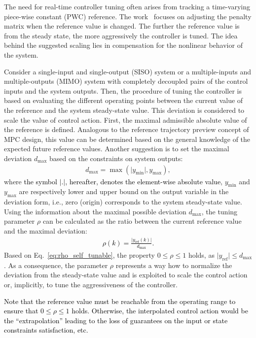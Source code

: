 \documentclass[preprint,12pt]{elsarticle}
\newcommand{\change}[1]{\textcolor{black}{#1}}
\begin{document}
	The need for real-time controller tuning often arises from tracking a time-varying piece-wise constant (PWC) reference. The work~\cite{self_tunable} focuses on adjusting the penalty matrix when the reference value is changed. The further the reference value is from the steady state, the more aggressively the controller is tuned. The idea behind the suggested scaling lies in compensation for the nonlinear behavior of the system.  
	
	Consider a single-input and single-output (SISO) system or a multiple-inputs and multiple-outputs (MIMO) system with completely decoupled pairs of the control inputs and the system outputs. 
	Then, the procedure of tuning the controller is based on evaluating the different operating points between the current value of the reference and the system steady-state value. This deviation is considered to scale the value of control action. First, the maximal admissible absolute value of the reference is defined. Analogous to the reference trajectory preview concept of MPC design, this value can be determined based on the general knowledge of the expected future reference values. Another suggestion is to set the maximal deviation $d_{\max}$ based on the constraints on system outputs: 	
	\begin{eqnarray}
		\label{eq:d_max}
		d_{\max} = \max(\vert y_{\min} \vert, y_{\max}),
	\end{eqnarray}	
	where \change{the symbol $\lvert.\rvert$, hereafter, denotes the element-wise absolute value}, $y_{\min}$ and $y_{\max}$ are respectively lower and upper bound on the output variable in the deviation form, i.e., zero (origin) corresponds to the system steady-state value. Using the information about the maximal possible deviation $d_{\max}$, the tuning parameter $\rho$ can be calculated as the ratio between the current reference value and the maximal deviation: 
	\change{ 
	\begin{eqnarray}
		\label{eq:rho_self_tunable}
		\rho (k) = \frac{\vert y_{\mathrm{ref}}(k) \vert}{d_{\max}}.
	\end{eqnarray}
	}
	Based on Eq.~\eqref{eq:rho_self_tunable}, the property $0 \le \rho \le 1$ holds, as $\vert y_{\mathrm{ref}} \vert \le d_{\max}$. As a consequence, the parameter $\rho$ represents a way how to normalize the deviation from the steady-state value and is exploited to scale the control action or, implicitly, to tune the aggressiveness of the controller. 
	
	\change{Note that the reference value must be reachable from the operating range to ensure that $0 \le \rho \le 1 $ holds. Otherwise, the interpolated control action would be the ``extrapolation'' leading to the loss of guarantees on the input or state constraints satisfaction, etc.} 
	
\end{document}
